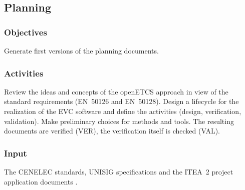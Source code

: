 \documentclass{template/openetcs_article}
\begin{document}
\addtocounter{subsection}{-1}
\subsection{Planning}
\label{sec:planningPhase}

\subsubsection{Objectives}
\label{sec:0-objectives}
Generate first versions of the planning documents.

\subsubsection{Activities}
\label{sec:0-activities}

Review the ideas and concepts of the openETCS approach in view of the
standard requirements (EN~50126 and EN~50128). Design a lifecycle for
the realization of the EVC software and define the activities (design,
verification, validation). Make preliminary choices for methods and
tools. The resulting documents are verified (VER), the verification
itself is checked (VAL).

\subsubsection{Input}
\label{sec:0-input}
The CENELEC standards, UNISIG specifications and the ITEA~2 project
application documents \cite{openETCS:FPP_4.0}.
\end{document}
